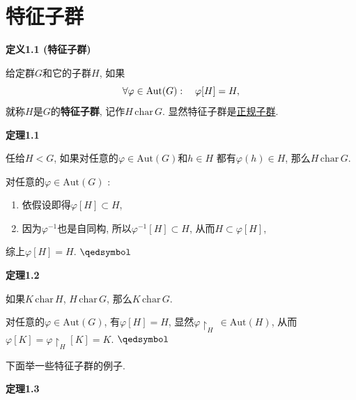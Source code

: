 \documentclass[UTF8]{ctexart}
\begin{document}
\setlength{\abovedisplayskip}{1pt}
\setlength{\belowdisplayskip}{1pt}

\section{特征子群}

\hypertarget{sec:定义1.1}{}
\noindent\textbf{定义1.1 (特征子群)}

给定群$G$和它的子群$H$, 如果
\vspace{-3pt}
\[
    \forall\varphi\in\mathrm{Aut}(G):\quad\varphi[H]=H,\\[-3pt]
\]
就称$H$是$G$的\textbf{特征子群}, 记作$H\,\mathrm{char}\,G$.
显然特征子群是\href{04 正规子群与商群#nameddest=sec:定义1.1}{正规子群}.

\vspace{10pt}

\hypertarget{sec:定理1.1}{}
\noindent\textbf{定理1.1}

任给$H<G$, 如果对任意的$\varphi\in\mathrm{Aut}(G)$和$h\in H$
都有$\varphi(h)\in H$, 那么$H\,\mathrm{char}\,G$.


对任意的$\varphi\in\mathrm{Aut}(G)$ :
\begin{enumerate}
    \item 依假设即得$\varphi[H]\subset H$,
    \item 因为$\varphi^{-1}$也是自同构, 所以$\varphi^{-1}[H]\subset H$,
    从而$H\subset\varphi[H]$,
\end{enumerate}
综上$\varphi[H]=H$. \hfill $\qedsymbol$

\vspace{10pt}

\hypertarget{sec:定理1.2}{}
\noindent\textbf{定理1.2}

如果$K\,\mathrm{char}\,H$, $H\,\mathrm{char}\,G$, 那么$K\,\mathrm{char}\,G$.


对任意的$\varphi\in\mathrm{Aut}(G)$, 有$\varphi[H]=H$,
显然$\varphi\!\restriction_{H}\,\in\mathrm{Aut}(H)$, 从而
$\varphi[K]=\varphi\!\restriction_{H}[K]=K$. \hfill $\qedsymbol$

\vspace{15pt}

下面举一些特征子群的例子.

\vspace{10pt}

\hypertarget{sec:定理1.3}{}
\noindent\textbf{定理1.3}
\end{document}
